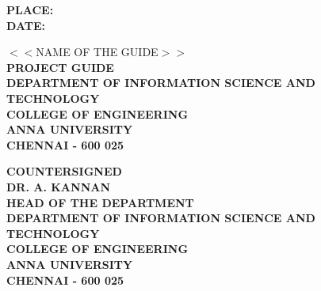 \documentclass[13 pt,a4paper]{aureportm}
\begin{document}
\begin{flushleft}
 \parbox[t]{\datewidth}{\small{\textbf{PLACE: }}\\
 \small{\textbf{DATE: }}}
 \hfill
 \parbox[t]{9 cm}{\scriptsize{$<<$NAME OF THE GUIDE$>>$} \\
 \scriptsize{\textbf{PROJECT GUIDE}}\\
 \scriptsize{\textbf{DEPARTMENT OF INFORMATION SCIENCE AND TECHNOLOGY}}\\
 \scriptsize{\textbf{COLLEGE OF ENGINEERING}}\\
 \scriptsize{\textbf{ANNA UNIVERSITY}}   \\
 \scriptsize{\textbf{CHENNAI - 600 025}}
 }
\end{flushleft}
\vspace{0.5 cm}
\begin{center}
 \small{\textbf{COUNTERSIGNED}}\\ 
  \vspace{1 cm}
  \textbf{\scriptsize{DR. A. KANNAN}}\\ 
  \scriptsize{\textbf{HEAD OF THE DEPARTMENT}}\\
 \scriptsize{\textbf{DEPARTMENT OF INFORMATION SCIENCE AND TECHNOLOGY}}\\
 \scriptsize{\textbf{COLLEGE OF ENGINEERING}}\\
 \scriptsize{\textbf{ANNA UNIVERSITY}}   \\
 \scriptsize{\textbf{CHENNAI - 600 025}}
 
\end{center}




%





\tableofcontents


\pagebreak

\listoftables
 \clearpage {} \listoffigures
\end{document}
